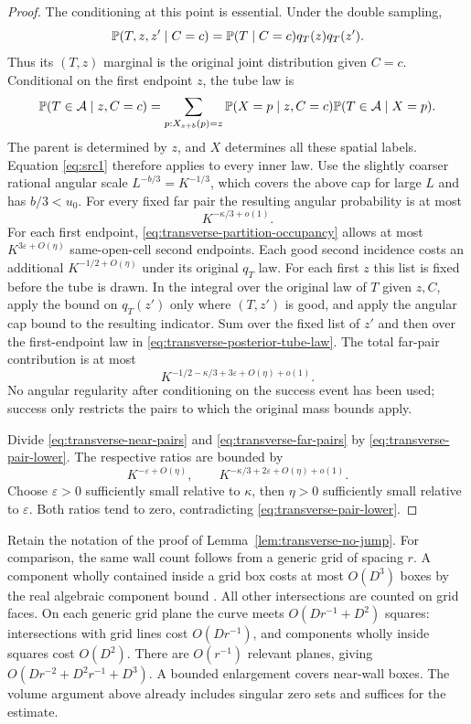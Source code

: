 \begin{proof}
The conditioning at this point is essential.  Under the double
sampling,
\[
 \mathbb P(T,z,z'\mid C=c)=\mathbb P(T\mid C=c)q_T(z)q_T(z').
\]
Thus its $(T,z)$ marginal is the original joint distribution given
$C=c$.  Conditional on the first endpoint $z$, the tube law is
\begin{equation}\label{eq:transverse-posterior-tube-law}
 \mathbb P(T\in\mathcal A\mid z,C=c)
   =\sum_{p:X_{s+b}(p)=z}
       \mathbb P(X=p\mid z,C=c)\mathbb P(T\in\mathcal A\mid X=p).
\end{equation}
The parent is determined by $z$, and $X$ determines all these
spatial labels.  Equation \eqref{eq:src1} therefore applies to
every inner law.  Use the slightly coarser rational angular scale
$L^{-b/3}=K^{-1/3}$, which covers the above cap for large $L$ and
has $b/3<u_0$.  For every fixed far pair the resulting angular
probability is at most
\[
 K^{-\kappa/3+o(1)}.
\]
For each first endpoint, \eqref{eq:transverse-partition-occupancy}
allows at most $K^{3\varepsilon+O(\eta)}$ same-open-cell second
endpoints.  Each good second incidence costs an additional
$K^{-1/2+O(\eta)}$ under its original $q_T$ law.  For each first $z$ this list is fixed before the tube is drawn.
In the integral over the original law of $T$ given $z,C$, apply the
bound on $q_T(z')$ only where $(T,z')$ is good, and apply the
angular cap bound to the resulting indicator.  Sum over the fixed
list of $z'$ and then over the first-endpoint law in
\eqref{eq:transverse-posterior-tube-law}.
The total far-pair contribution is at most
\begin{equation}\label{eq:transverse-far-pairs}
 K^{-1/2-\kappa/3+3\varepsilon+O(\eta)+o(1)}.
\end{equation}
No angular regularity after conditioning on the success event has
been used; success only restricts the pairs to which the original
mass bounds apply.

Divide \eqref{eq:transverse-near-pairs} and
\eqref{eq:transverse-far-pairs} by
\eqref{eq:transverse-pair-lower}.  The respective ratios are bounded
by
\[
 K^{-\varepsilon+O(\eta)},\qquad
 K^{-\kappa/3+2\varepsilon+O(\eta)+o(1)}.
\]
Choose $\varepsilon>0$ sufficiently small relative to $\kappa$,
then $\eta>0$ sufficiently small relative to $\varepsilon$.
Both ratios tend to zero, contradicting
\eqref{eq:transverse-pair-lower}.
\end{proof}

\begin{remark}
Retain the notation of the proof of Lemma~\ref{lem:transverse-no-jump}.
For comparison, the same wall count follows from a generic grid of
spacing $r$.  A component wholly contained inside a grid box costs
at most $O(D^3)$ boxes by the real algebraic component bound
\cite[Lemma~(C), p.~181]{W93}.
All other intersections are counted on grid faces.  On each
generic grid plane the curve meets $O(Dr^{-1}+D^2)$ squares:
intersections with grid lines cost $O(Dr^{-1})$, and components
wholly inside squares cost $O(D^2)$.  There are $O(r^{-1})$
relevant planes, giving
$O(Dr^{-2}+D^2r^{-1}+D^3)$.  A bounded enlargement covers near-wall
boxes.  The volume argument above already includes singular zero
sets and suffices for the estimate.
\end{remark}

